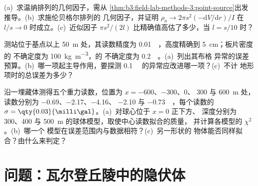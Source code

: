 \begin{exercise}[$\star\star\star$]\label{exo:b3:field-lab-methods-3:10}
(a)~求温纳排列的几何因子，需从
\cref{thm:b3:field-lab-methods-3:point-source}出发推导。(b)~求施伦贝格尔排列的
几何因子，并证明 $\rho_a \to 2\pi s^2(-\mathrm{d}V/
\mathrm{d}r)/I$ 在 $l/s \to 0$ 时成立。(c)~近似因子
$\pi s^2/(2l)$ 比精确值高估了多少，当 $l = s/10$ 时？
\end{exercise}

\begin{exercise}[$\star\star\star$]\label{exo:b3:field-lab-methods-3:11}
测站位于基点以上 \qty{50}{m} 处，其读数精度为
\qty{0.01}{\milli\gal}，高度精确到 \qty{5}{cm}；板片密度的
不确定度为 \qty{100}{kg.m^{-3}}，的
不确定度为 \qty{0.2}{\milli\gal}。(a)~列出其布格
异常的误差预算。(b)~哪一项起主导作用，要探测
\qty{0.1}{\milli\gal} 的异常应改进哪一项？(c)~不计
地形项时的总误差为多少？
\end{exercise}

\begin{exercise}[$\star\star\star$]\label{exo:b3:field-lab-methods-3:12}
沿一埋藏体测得五个重力读数，位置为 $x = -600$、$-300$、$0$、
$300$ 与 \qty{600}{m} 处，读数分别为 \num{-0.69}、\num{-2.17}、\num{-4.16}、
\num{-2.10} 与 \qty{-0.73}{\milli\gal}，每个读数的 $\sigma =
\qty{0.03}{\milli\gal}$。(a)~对球心位于 $x = 0$ 正下方、
深度分别为 \num{300}、\num{400} 与 \qty{500}{m} 的球体模型，取使中心读数拟合的质量，
并计算各模型的 $\chi^2$。(b)~哪一个
模型在误差范围内与数据相符？(c)~另一形状的
物体能否同样拟合？由什么来判定？
\end{exercise}

\section{问题：瓦尔登丘陵中的隐伏体}

